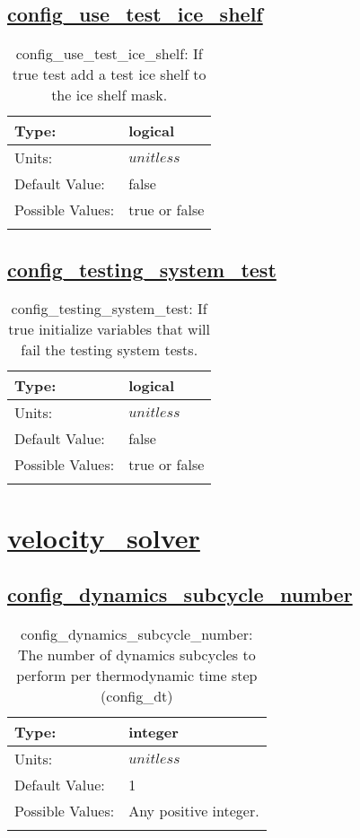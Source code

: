 \subsection[config\_use\_test\_ice\_shelf]{\hyperref[sec:nm_tab_unit_test]{config\_use\_test\_ice\_shelf}}
\label{subsec:nm_sec_config_use_test_ice_shelf}
\begin{center}
\begin{longtable}{| p{2.0in} || p{4.0in} |}
    \hline
    Type: & logical \\
    \hline
    Units: & $unitless$ \\
    \hline
    Default Value: & false \\
    \hline
    Possible Values: & true or false \\
    \hline
    \caption{config\_use\_test\_ice\_shelf: If true test add a test ice shelf to the ice shelf mask.}
\end{longtable}
\end{center}
\subsection[config\_testing\_system\_test]{\hyperref[sec:nm_tab_unit_test]{config\_testing\_system\_test}}
\label{subsec:nm_sec_config_testing_system_test}
\begin{center}
\begin{longtable}{| p{2.0in} || p{4.0in} |}
    \hline
    Type: & logical \\
    \hline
    Units: & $unitless$ \\
    \hline
    Default Value: & false \\
    \hline
    Possible Values: & true or false \\
    \hline
    \caption{config\_testing\_system\_test: If true initialize variables that will fail the testing system tests.}
\end{longtable}
\end{center}
\section[velocity\_solver]{\hyperref[sec:nm_tab_velocity_solver]{velocity\_solver}}
\label{sec:nm_sec_velocity_solver}
\subsection[config\_dynamics\_subcycle\_number]{\hyperref[sec:nm_tab_velocity_solver]{config\_dynamics\_subcycle\_number}}
\label{subsec:nm_sec_config_dynamics_subcycle_number}
\begin{center}
\begin{longtable}{| p{2.0in} || p{4.0in} |}
    \hline
    Type: & integer \\
    \hline
    Units: & $unitless$ \\
    \hline
    Default Value: & 1 \\
    \hline
    Possible Values: & Any positive integer. \\
    \hline
    \caption{config\_dynamics\_subcycle\_number: The number of dynamics subcycles to perform per thermodynamic time step (config\_dt)}
\end{longtable}
\end{center}
